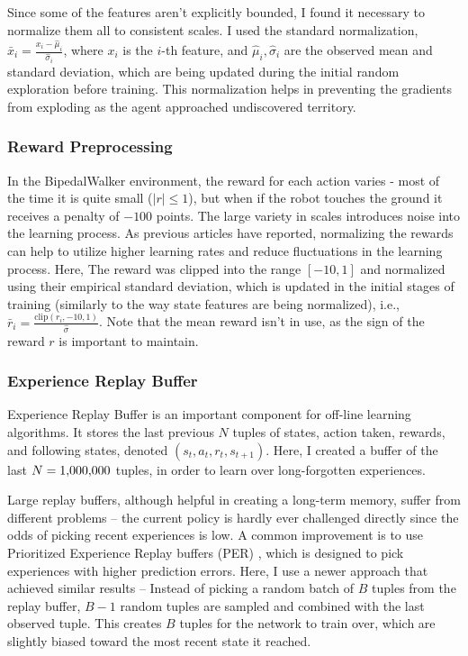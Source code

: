 \documentclass{article}
\begin{document}
\begin{multicols}{2}
Since some of the features aren't explicitly bounded, I found it necessary to normalize them all to consistent scales. I used the standard normalization, $\bar{x}_i = \frac{x_i - \hat{\mu}_i}{\hat{\sigma}_i}$, where $x_i$ is the $i$-th feature, and $\hat{\mu}_i, \hat{\sigma}_i$ are the observed mean and standard deviation, which are being updated during the initial random exploration before training. This normalization helps in preventing the gradients from exploding as the agent approached undiscovered territory.

\subsubsection{Reward Preprocessing}
In the BipedalWalker environment, the reward for each action varies - most of the time it is quite small ($|r| \leq 1$), but when if the robot touches the ground it receives a penalty of $-100$ points. The large variety in scales introduces noise into the learning process. As previous articles have reported, normalizing the rewards can help to utilize higher learning rates and reduce fluctuations in the learning process. Here, The reward was clipped into the range $[-10, 1]$ and normalized using their empirical standard deviation, which is updated in the initial stages of training (similarly to the way state features are being normalized), i.e., $\bar{r}_i = \frac{\text{clip}(r_i, -10, 1)}{\hat{\sigma}}$. Note that the mean reward isn't in use, as the sign of the reward $r$ is important to maintain.

\subsubsection{Experience Replay Buffer}
Experience Replay Buffer is an important component for off-line learning algorithms. It stores the last previous $N$ tuples of states, action taken, rewards, and following states, denoted $(s_t, a_t, r_t, s_{t+1})$. Here, I created a buffer of the last $N=1{\small ,}000{\small ,}000$ tuples, in order to learn over long-forgotten experiences. 

Large replay buffers, although helpful in creating a long-term memory, suffer from different problems -- the current policy is hardly ever challenged directly since the odds of picking recent experiences is low. A common improvement is to use Prioritized Experience Replay buffers (PER) \cite{PER}, which is designed to pick experiences with higher prediction errors. Here, I use a newer approach that achieved similar results \cite{ExpReplay} -- Instead of picking a random batch of $B$ tuples from the replay buffer, $B-1$ random tuples are sampled and combined with the last observed tuple. This creates $B$ tuples for the network to train over, which are slightly biased toward the most recent state it reached.


\end{multicols}
\end{document}
